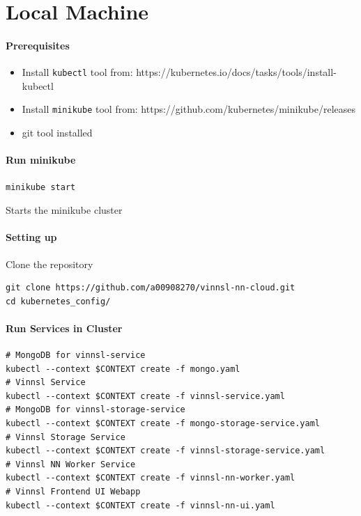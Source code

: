 \section{Local Machine}\label{local-machine}

\paragraph{Prerequisites}\label{prerequisites}

\begin{itemize}
\tightlist
\item
  Install \texttt{kubectl} tool from:
  https://kubernetes.io/docs/tasks/tools/install-kubectl
\item
  Install \texttt{minikube} tool from:
  https://github.com/kubernetes/minikube/releases
\item
  git tool installed
\end{itemize}

\paragraph{Run minikube}\label{run-minikube}

\texttt{minikube\ start}

Starts the minikube cluster

\paragraph{Setting up}\label{setting-up}

Clone the repository

\begin{verbatim}
git clone https://github.com/a00908270/vinnsl-nn-cloud.git
cd kubernetes_config/
\end{verbatim}

\paragraph{Run Services in Cluster}\label{run-services-in-cluster}

\begin{verbatim}
# MongoDB for vinnsl-service
kubectl --context $CONTEXT create -f mongo.yaml 
# Vinnsl Service
kubectl --context $CONTEXT create -f vinnsl-service.yaml
# MongoDB for vinnsl-storage-service
kubectl --context $CONTEXT create -f mongo-storage-service.yaml
# Vinnsl Storage Service
kubectl --context $CONTEXT create -f vinnsl-storage-service.yaml
# Vinnsl NN Worker Service
kubectl --context $CONTEXT create -f vinnsl-nn-worker.yaml
# Vinnsl Frontend UI Webapp
kubectl --context $CONTEXT create -f vinnsl-nn-ui.yaml
\end{verbatim}


